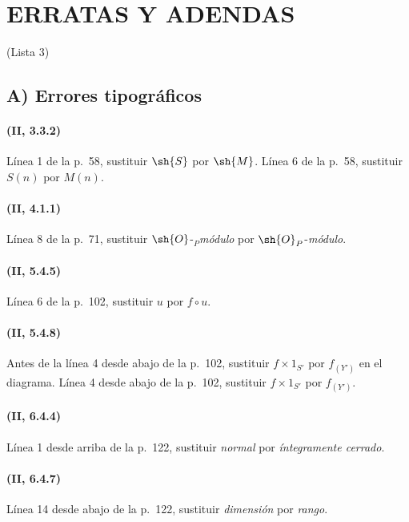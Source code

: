 \clearpage
{}
{}
\section*{ERRATAS Y ADENDAS}
\begin{center}\large (Lista 3)\end{center}

\subsection*{A) Errores tipográficos}

\paragraph{(II, 3.3.2)}
Línea 1 de la p.~58, sustituir $\sh{S}$ por $\sh{M}$. Línea 6 de la
p.~58, sustituir $S(n)$ por $M(n)$.

\paragraph{(II, 4.1.1)}
Línea 8 de la p.~71, sustituir $\sh{O}$-${}_P$\emph{módulo} por
$\sh{O}_P$-\emph{módulo}.

\paragraph{(II, 5.4.5)}
Línea 6 de la p.~102, sustituir $u$ por $f\circ u$.

\paragraph{(II, 5.4.8)}
Antes de la línea 4 desde abajo de la p.~102, sustituir $f\times1_{S'}$ por
$f_{(Y')}$ en el diagrama. Línea 4 desde abajo de la p.~102, sustituir
$f\times1_{S'}$ por $f_{(Y')}$.

\paragraph{(II, 6.4.4)}
Línea 1 desde arriba de la p.~122, sustituir \emph{normal} por \emph{íntegramente cerrado}.

\paragraph{(II, 6.4.7)}
Línea 14 desde abajo de la p.~122, sustituir \emph{dimensión} por \emph{rango}.

